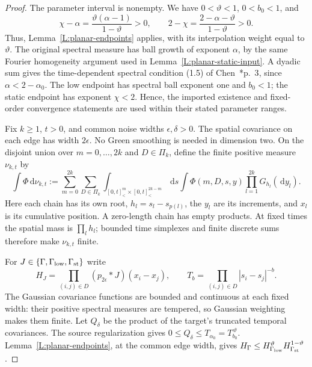\documentclass[12pt]{article}
\numberwithin{equation}{section}
\theoremstyle{definition}
\newcommand{\ud}{\,\mathrm{d}}
\begin{document}
\begin{proof}
  The parameter interval is nonempty. We have $0<\vartheta<1$,
  $0<b_0<1$, and
  \[
    \chi-\alpha=\frac{\vartheta(\alpha-1)}{1-\vartheta}>0,
    \qquad
    2-\chi=\frac{2-\alpha-\vartheta}{1-\vartheta}>0.
  \]
  Thus, Lemma~\ref{L:planar-endpoints} applies, with its interpolation
  weight equal to $\vartheta$. The original spectral measure has ball
  growth of exponent $\alpha$, by the same Fourier homogeneity argument
  used in Lemma~\ref{L:planar-static-input}. A dyadic sum gives the
  time-dependent spectral condition (1.5) of
  Chen~\cite{chen:author2026:time-dependency}*{p.~3}, since
  $\alpha<2-\alpha_0$. The low endpoint has spectral ball exponent
  one and $b_0<1$; the static endpoint has exponent $\chi<2$.
  Hence, the imported existence and fixed-order convergence statements
  are used within their stated parameter ranges.

  Fix $k\ge1$, $t>0$, and common noise widths $\epsilon,\delta>0$.
  The spatial covariance on each edge has width $2\epsilon$.
  No Green smoothing is needed in dimension two. On the disjoint union
  over $m=0,\ldots,2k$ and $D\in\Pi_k$, define the finite positive
  measure $\nu_{k,t}$ by
  \[
    \int\Phi\ud\nu_{k,t}
    :=\sum_{m=0}^{2k}\sum_{D\in\Pi_k}
    \int_{[0,t]^m_<\times[0,t]^{2k-m}_<}\ud s
    \int\Phi(m,D,s,y)\prod_{l=1}^{2k}G_{h_l}(\ud y_l).
  \]
  Here each chain has its own root, $h_l=s_l-s_{p(l)}$, the $y_l$
  are its increments, and $x_l$ is its cumulative position. A zero-length
  chain has empty products. At fixed times the spatial mass is
  $\prod_lh_l$; bounded time simplexes and finite discrete sums therefore
  make $\nu_{k,t}$ finite.

  For $J\in\{\Gamma,\Gamma_{\rm low},\Gamma_{\rm st}\}$ write
  \[
    H_J=\prod_{(i,j)\in D}(p_{2\epsilon}*J)(x_i-x_j),\qquad
    T_b=\prod_{(i,j)\in D}|s_i-s_j|^{-b}.
  \]
  The Gaussian covariance functions are bounded and continuous at each
  fixed width: their positive spectral measures are tempered, so Gaussian
  weighting makes them finite. Let $Q_\delta$ be the product of the
  target's truncated temporal covariances. The source regularization gives
  $0\le Q_\delta\le T_{\alpha_0}=T_{b_0}^{\,\vartheta}$.
  Lemma~\ref{L:planar-endpoints}, at the common edge width, gives
  $H_\Gamma\le H_{\Gamma_{\rm low}}^\vartheta
  H_{\Gamma_{\rm st}}^{1-\vartheta}$.


\end{proof}
\end{document}
